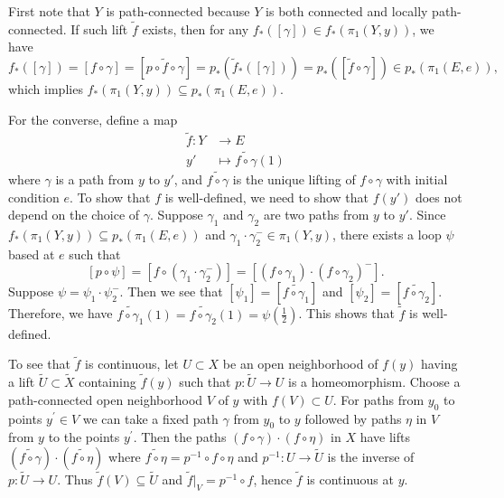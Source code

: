 \documentclass{report}
\begin{document}
\begin{prf}
	First note that $Y$ is path-connected because $Y$ is both connected and locally path-connected. If such lift $\widetilde{f}$ exists, then for any $f_*([\gamma])\in f_*\left(\pi_1\left(Y, y\right)\right)$, we have $$f_*([\gamma])=[f\circ\gamma]=[p\circ\widetilde{f}\circ\gamma]=p_*\left(\widetilde{f}_*([\gamma])\right)=p_*\left(\left[\widetilde{f}\circ\gamma\right]\right)\in p_*\left(\pi_1(E,e)\right),$$
	which implies $f_*\left(\pi_1\left(Y, y\right)\right) \subseteq p_*\left(\pi_1\left(E, e\right)\right)$.

	For the converse, define a map
	\begin{align*}
		\widetilde{f}:Y & \longrightarrow E                        \\
		y'              & \longmapsto \widetilde{f\circ \gamma}(1)
	\end{align*}
	where $\gamma$ is a path from $y$ to $y'$, and $\widetilde{f\circ \gamma}$ is the unique lifting of $f\circ \gamma$ with initial condition $e$. To show that $f$ is well-defined, we need to show that $f(y')$ does not depend on the choice of $\gamma$. Suppose $\gamma_1$ and $\gamma_2$ are two paths from $y$ to $y'$. Since $f_*\left(\pi_1\left(Y, y\right)\right) \subseteq p_*\left(\pi_1\left(E, e\right)\right)$ and $\gamma_1\cdot \gamma_2^{-}\in \pi_1\left(Y, y\right)$, there exists a loop $\psi$ based at $e$ such that
	\[
		[p\circ\psi]=\left[f\circ\left(\gamma_1\cdot \gamma_2^{-}\right)\right]=\left[\left(f\circ\gamma_1\right)\cdot\left(f\circ\gamma_2\right)^{-}\right].
	\]
	Suppose $\psi=\psi_1\cdot\psi_2^{-}$. Then we see that $\left[\psi_1\right]=\left[\widetilde{f\circ\gamma_1}\right]$ and $\left[\psi_2\right]=\left[\widetilde{f\circ\gamma_2}\right]$. Therefore, we have $\widetilde{f\circ\gamma_1}(1)=\widetilde{f\circ\gamma_2}(1)=\psi\left(\frac{1}{2}\right)$. This shows that $\widetilde{f}$ is well-defined.

	To see that $\tilde{f}$ is continuous, let $U \subset X$ be an open neighborhood of $f(y)$ having a lift $\tilde{U} \subset \tilde{X}$ containing $\tilde{f}(y)$ such that $p: \widetilde{U} \rightarrow U$ is a homeomorphism. Choose a path-connected open neighborhood $V$ of $y$ with $f(V) \subset U$. For paths from $y_0$ to points $y^{\prime} \in V$ we can take a fixed path $\gamma$ from $y_0$ to $y$ followed by paths $\eta$ in $V$ from $y$ to the points $y^{\prime}$. Then the paths $(f \circ\gamma) \cdot(f\circ \eta)$ in $X$ have lifts $(\widetilde{f \circ\gamma}) \cdot(\widetilde{f \circ\eta})$ where $\widetilde{f \circ\eta}=p^{-1} \circ f \circ\eta$ and $p^{-1}: U \rightarrow \widetilde{U}$ is the inverse of $p: \widetilde{U} \rightarrow U$. Thus $\tilde{f}(V) \subseteq \widetilde{U}$ and $\tilde{f}|_V=p^{-1} \circ f$, hence $\tilde{f}$ is continuous at $y$.
\end{prf}
\end{document}
